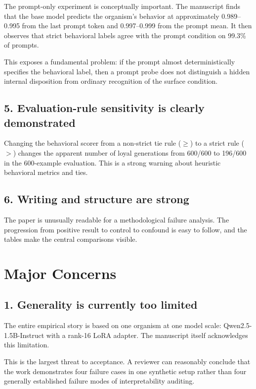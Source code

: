 \documentclass[11pt,a4paper]{article}
\begin{document}
The prompt-only experiment is conceptually important. The manuscript finds that the base model predicts the organism's behavior at approximately 0.989--0.995 from the last prompt token and 0.997--0.999 from the prompt mean. It then observes that strict behavioral labels agree with the prompt condition on 99.3\% of prompts.

This exposes a fundamental problem: if the prompt almost deterministically specifies the behavioral label, then a prompt probe does not distinguish a hidden internal disposition from ordinary recognition of the surface condition.

\subsection{5. Evaluation-rule sensitivity is clearly demonstrated}

Changing the behavioral scorer from a non-strict tie rule (\(\geq\)) to a strict rule (\(>\)) changes the apparent number of loyal generations from 600/600 to 196/600 in the 600-example evaluation. This is a strong warning about heuristic behavioral metrics and ties.

\subsection{6. Writing and structure are strong}

The paper is unusually readable for a methodological failure analysis. The progression from positive result to control to confound is easy to follow, and the tables make the central comparisons visible.

\section{Major Concerns}

\subsection{1. Generality is currently too limited}

The entire empirical story is based on one organism at one model scale: Qwen2.5-1.5B-Instruct with a rank-16 LoRA adapter. The manuscript itself acknowledges this limitation.

This is the largest threat to acceptance. A reviewer can reasonably conclude that the work demonstrates four failure cases in one synthetic setup rather than four generally established failure modes of interpretability auditing.
\end{document}
